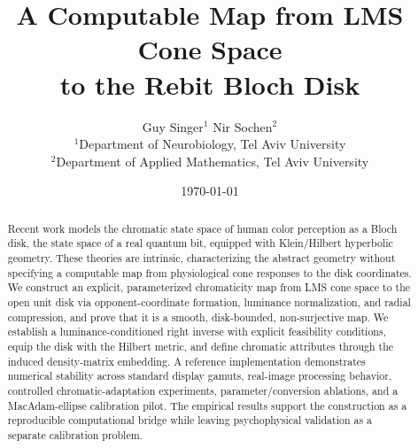 \documentclass[11pt]{article}
\title{\textbf{A Computable Map from LMS Cone Space \\to the Rebit Bloch Disk}}
\author{%
Guy Singer$^{1}$ \qquad Nir Sochen$^{2}$\\[0.5em]
\small $^{1}$Department of Neurobiology, Tel Aviv University\\
\small $^{2}$Department of Applied Mathematics, Tel Aviv University%
}
\date{\today}
\theoremstyle{plain}
\theoremstyle{definition}
\theoremstyle{remark}
\begin{document}
\maketitle

\begin{abstract}

Recent work models the chromatic state space of human color perception as a Bloch disk, the state space of a real quantum bit, equipped with Klein/Hilbert hyperbolic geometry. These theories are intrinsic, characterizing the abstract geometry without specifying a computable map from physiological cone responses to the disk coordinates. We construct an explicit, parameterized chromaticity map from LMS cone space to the open unit disk via opponent-coordinate formation, luminance normalization, and radial compression, and prove that it is a smooth, disk-bounded, non-surjective map. We establish a luminance-conditioned right inverse with explicit feasibility conditions, equip the disk with the Hilbert metric, and define chromatic attributes through the induced density-matrix embedding. A reference implementation demonstrates numerical stability across standard display gamuts, real-image processing behavior, controlled chromatic-adaptation experiments, parameter/conversion ablations, and a MacAdam-ellipse calibration pilot. The empirical results support the construction as a reproducible computational bridge while leaving psychophysical validation as a separate calibration problem.
\end{abstract}

\newpage
\tableofcontents
\newpage



\end{document}

